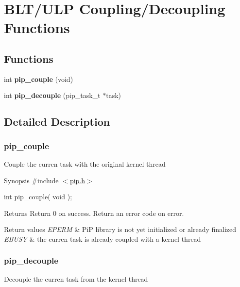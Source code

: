 \hypertarget{group__ulp-6-coupling}{\section{B\-L\-T/\-U\-L\-P Coupling/\-Decoupling Functions}
\label{group__ulp-6-coupling}
}
\subsection*{Functions}
\begin{DoxyCompactItemize}
\item 
\hypertarget{group__ulp-6-coupling_ga62b74934c0295bbe1aeab544365eb20f}{int {\bfseries pip\-\_\-couple} (void)}\label{group__ulp-6-coupling_ga62b74934c0295bbe1aeab544365eb20f}

\item 
\hypertarget{group__ulp-6-coupling_ga1c77a30388d68e5f12667007ae430c1b}{int {\bfseries pip\-\_\-decouple} (pip\-\_\-task\-\_\-t $\ast$task)}\label{group__ulp-6-coupling_ga1c77a30388d68e5f12667007ae430c1b}

\end{DoxyCompactItemize}


\subsection{Detailed Description}
\hypertarget{pip_couple}{}\subsubsection{pip\-\_\-couple}\label{pip_couple}
Couple the curren task with the original kernel thread

\begin{DoxyParagraph}{Synopsis}
\#include $<$\hyperlink{pip_8h_source}{pip.\-h}$>$ \par
int pip\-\_\-couple( void );
\end{DoxyParagraph}
\begin{DoxyReturn}{Returns}
Return 0 on success. Return an error code on error. 
\end{DoxyReturn}

\begin{DoxyRetVals}{Return values}
{\em E\-P\-E\-R\-M} & Pi\-P library is not yet initialized or already finalized \\
\hline
{\em E\-B\-U\-S\-Y} & the curren task is already coupled with a kernel thread \\
\hline
\end{DoxyRetVals}
\hypertarget{pip_decouple}{}\subsubsection{pip\-\_\-decouple}\label{pip_decouple}
Decouple the curren task from the kernel thread

